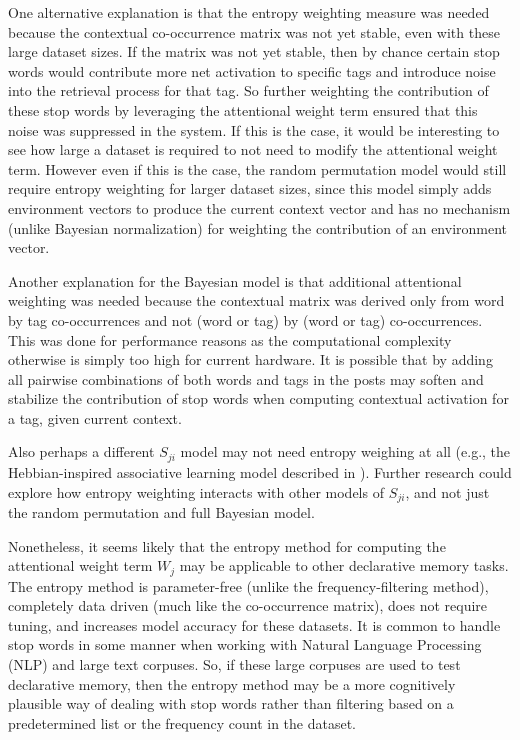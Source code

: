 \documentclass[man,floatsintext,donotrepeattitle]{apa6}
\begin{document}
One alternative explanation is that the entropy weighting measure was needed because the contextual co-occurrence matrix was not yet stable, even with these large dataset sizes.
If the matrix was not yet stable, then by chance certain stop words would contribute more net activation to specific tags and introduce noise into the retrieval process for that tag.
So further weighting the contribution of these stop words by leveraging the attentional weight term ensured that this noise was suppressed in the system.
If this is the case, it would be interesting to see how large a dataset is required to not need to modify the attentional weight term.
However even if this is the case, the random permutation model would still require entropy weighting for larger dataset sizes,
since this model simply adds environment vectors to produce the current context vector and has no mechanism (unlike Bayesian normalization) for weighting the contribution of an environment vector.

Another explanation for the Bayesian model is that additional attentional weighting was needed because the contextual matrix was derived only from word by tag co-occurrences and not (word or tag) by (word or tag) co-occurrences.
This was done for performance reasons as the computational complexity otherwise is simply too high for current hardware.
It is possible that by adding all pairwise combinations of both words and tags in the posts may soften and stabilize the contribution of stop words when computing contextual activation for a tag, given current context.

Also perhaps a different $S_{ji}$ model may not need entropy weighing at all (e.g., the Hebbian-inspired associative learning model described in \textcite{thomson2013constraining}).
Further research could explore how entropy weighting interacts with other models of $S_{ji}$, and not just the random permutation and full Bayesian model.

Nonetheless, it seems likely that the entropy method for computing the attentional weight term $W_{j}$ may be applicable to other declarative memory tasks.
The entropy method is parameter-free (unlike the frequency-filtering method), completely data driven (much like the co-occurrence matrix), does not require tuning,
and increases model accuracy for these datasets.
It is common to handle stop words in some manner when working with Natural Language Processing (NLP) and large text corpuses.
So, if these large corpuses are used to test declarative memory,
then the entropy method may be a more cognitively plausible way of dealing with stop words rather than filtering based on a predetermined list or the frequency count in the dataset.
\end{document}
